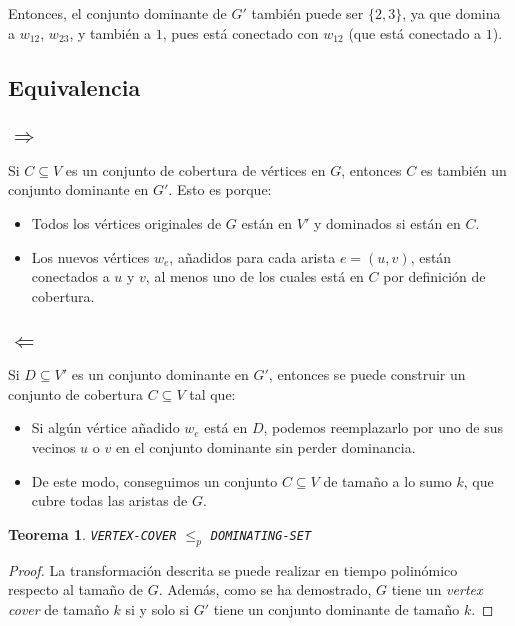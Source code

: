 \documentclass[a4paper,12pt]{article}
\newtheorem{theorem}{Teorema}
\begin{document}
Entonces, el conjunto dominante de \( G' \) también puede ser \( \{2,3\} \), ya que domina a \( w_{12} \), \( w_{23} \), y también a \( 1 \), pues está conectado con \( w_{12} \) (que está conectado a \( 1 \)).

\subsection{Equivalencia}
\subsection*{\( \Rightarrow \)}
Si \( C \subseteq V \) es un conjunto de cobertura de vértices en \( G \), entonces \( C \) es también un conjunto dominante en \( G' \). Esto es porque:
\begin{itemize}
    \item Todos los vértices originales de \( G \) están en \( V' \) y dominados si están en \( C \).
    \item Los nuevos vértices \( w_e \), añadidos para cada arista \( e = (u, v) \), están conectados a \( u \) y \( v \), al menos uno de los cuales está en \( C \) por definición de cobertura.
\end{itemize}

\subsection*{\( \Leftarrow \)}
Si \( D \subseteq V' \) es un conjunto dominante en \( G' \), entonces se puede construir un conjunto de cobertura \( C \subseteq V \) tal que:
\begin{itemize}
    \item Si algún vértice añadido \( w_e \) está en \( D \), podemos reemplazarlo por uno de sus vecinos \( u \) o \( v \) en el conjunto dominante sin perder dominancia.
    \item De este modo, conseguimos un conjunto \( C \subseteq V \) de tamaño a lo sumo \( k \), que cubre todas las aristas de \( G \).
\end{itemize}

\begin{theorem}
\texttt{VERTEX-COVER} \( \leq_p \) \texttt{DOMINATING-SET}
\end{theorem}

\begin{proof}
La transformación descrita se puede realizar en tiempo polinómico respecto al tamaño de \( G \). Además, como se ha demostrado, \( G \) tiene un \textit{vertex cover} de tamaño \( k \) si y solo si \( G' \) tiene un conjunto dominante de tamaño \( k \).
\end{proof}
\end{document}
